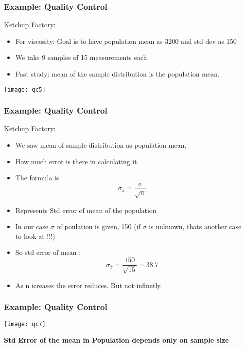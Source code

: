 
\begin{frame}[fragile]\frametitle{Example: Quality Control}
Ketchup Factory:
\begin{itemize}
\item For viscosity: Goal is to have population mean as 3200 and std dev as 150
\item We take 9 samples of 15 measurements each
\item Past study: mean of the sample distribution is the population mean.
\end{itemize}
\begin{center}
\texttt{[image: qc5]}
\end{center}
\end{frame}

\begin{frame}[fragile]\frametitle{Example: Quality Control}
Ketchup Factory:
\begin{itemize}
\item We saw mean of sample distribution as population mean.
\item How much error is there in calculating it.
\item The formula is $$\sigma_{\bar{x}} = \frac{\sigma}{\sqrt{n}}$$
\item Represents Std error of mean of the population
\item In our case $\sigma$ of poulation is given, 150 (if $\sigma$ is unknown, thats another case to look at !!!)
\item So std error of mean : $$\sigma_{\bar{x}} = \frac{150}{\sqrt{15}} = 38.7$$
\item As n icreases the error reduces. But not infinetly.
\end{itemize}

\end{frame}

\begin{frame}[fragile]\frametitle{Example: Quality Control}
\begin{center}
\texttt{[image: qc7]}
\end{center}
{\bf Std Error of the mean in Population depends only on sample size}
\end{frame}


